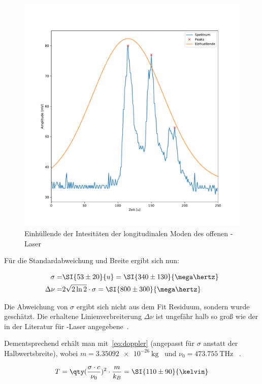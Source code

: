 \documentclass[slug=GL, room=HZDR\ Dresden/Rossendorf\,\ Geb.\ 620/123, supervisor=Tim\ Ziegler]{../../Lab_Report_LaTeX/lab_report}
\newcommand{\hne}{\ce{HeNe}-Laser}
\begin{document}
\begin{figure}[b]\centering
  \includegraphics[width=.8\columnwidth]{figs/verbr_fit.pdf}

  \caption{Einh\"ullende der Intesit\"aten der longitudinalen Moden
    des offenen \hne{}}
  \label{fig:fit_einh}
\end{figure}

F\"ur die Standardabweichung und Breite ergibt sich nun:

\begin{align}
  \sigma =& \SI{53\pm 20}{u} = \SI{340\pm 130}{\mega\hertz} \\
  \Delta\nu =& 2\sqrt{2\ln{2}}\cdot\sigma = \SI{800\pm 300}{\mega\hertz}
\end{align}

Die Abweichung von \(\sigma\) ergibt sich nicht aus dem Fit Residuum,
sondern wurde gesch\"atzt. Die erhaltene Linienverbreiterung
\(\Delta\nu\) ist ungef\"ahr halb so gro\ss{} wie der in der
Literatur f\"ur \hne{} angegebene~\cite[60]{Sigrist2018}.

Dementsprechend erh\"alt man mit~\ref{eq:doppler} (angepasst f\"ur
\(\sigma\) anstatt der Halbwertsbreite), wobei
\(m=\SI{3.35092e-26}{\kg}\)~\cite{IUPAC2013} und
\(\nu_0=\SI{473.755}{\tera\hertz}\) ~\cite[226]{Sigrist2018}.

\begin{align}
  \label{eq:temp}
  T = \qty(\frac{\sigma\cdot c}{\nu_0})^2\cdot \frac{m}{k_B}=\SI{110\pm 90}{\kelvin}
\end{align}
\end{document}

